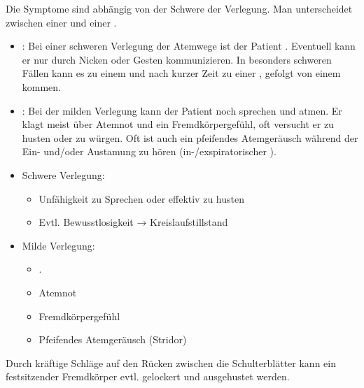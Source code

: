 {%
{}
{%
Die Symptome sind abhängig  von der Schwere der Verlegung.
Man unterscheidet zwischen einer  und einer
\citep{Erc2005Sec2,Erc2005Sec6,Erc2005DeSec2,Erc2005DeSec6}.

\begin{itemize}
  \item {}:
  Bei einer schweren Verlegung der Atemwege ist der Patient
  . Eventuell kann
  er nur durch Nic\-k\-en oder Gesten kommunizieren. In besonders
  schweren Fällen kann es zu einem  und nach
  kurzer Zeit zu einer , gefolgt von einem
   kommen.
  \item {}: Bei der milden Verlegung kann
  der Patient noch sprechen und atmen. Er klagt meist über
  Atemnot und ein Fremdkörpergefühl, oft versucht er zu husten
  oder zu würgen. Oft ist auch ein pfeifendes Atemgeräusch
  während der Ein- und/oder Austamung zu hören
  (in-/exspiratorischer ).
\end{itemize}


}{
\begin{itemize}
  \item Schwere Verlegung:
  \begin{itemize}
    \item Unfähigkeit zu Sprechen oder effektiv zu husten
    \item Evtl. Bewusstlosigkeit → Kreislaufstillstand
  \end{itemize}
  \item Milde Verlegung:
  \begin{itemize}
    \item {}.
    \item Atemnot
    \item Fremdkörpergefühl
    \item Pfeifendes Atemgeräusch (Stridor)
  \end{itemize}
\end{itemize}
} 
{} 
{} 
{}


{%
Durch kräftige Schläge auf den Rücken zwischen die
Schulterblätter kann  ein festsitzender Fremdkörper evtl.
gelockert und ausgehustet werden.}
{}{}{}{}


}
